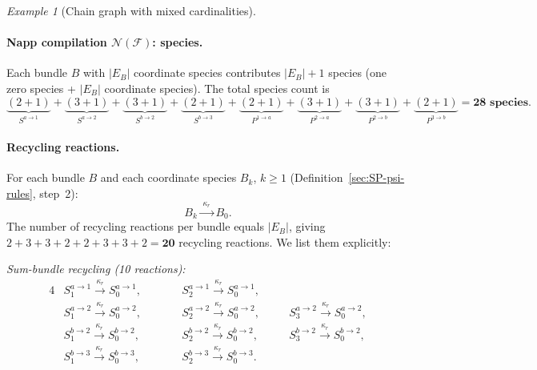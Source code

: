 \documentclass{article}
\theoremstyle{plain}
\theoremstyle{definition}
\theoremstyle{remark}
\newtheorem{example}{Example}[section]
\newcommand{\<}{\langle}
\renewcommand{\>}{\rangle}
\begin{document}
\begin{example}[Chain graph with mixed cardinalities]
 
\paragraph{Napp compilation $\boldsymbol{\mathcal{N}(\mathcal{F})}$: species.}
Each bundle $B$ with $|E_B|$ coordinate species contributes $|E_B|+1$ species
(one zero species + $|E_B|$ coordinate species).
The total species count is
\[
\underbrace{(2{+}1)}_{S^{a\to 1}}
+\underbrace{(3{+}1)}_{S^{a\to 2}}
+\underbrace{(3{+}1)}_{S^{b\to 2}}
+\underbrace{(2{+}1)}_{S^{b\to 3}}
+\underbrace{(2{+}1)}_{P^{1\to a}}
+\underbrace{(3{+}1)}_{P^{2\to a}}
+\underbrace{(3{+}1)}_{P^{2\to b}}
+\underbrace{(2{+}1)}_{P^{3\to b}}
= \mathbf{28 \textbf{ species}}.
\]
 
 
\paragraph{Recycling reactions.}
For each bundle $B$ and each coordinate species $B_k$, $k\ge 1$
(Definition~\ref{sec:SP-psi-rules}, step~2):
\[
B_k \xrightarrow{\;\kappa_r\;} B_0.
\]
The number of recycling reactions per bundle equals $|E_B|$, giving
$2+3+3+2+2+3+3+2 = \mathbf{20}$ recycling reactions.
We list them explicitly:
 
\medskip
\noindent\emph{Sum-bundle recycling (10 reactions):}
\begin{alignat*}{4}
&S^{a\to 1}_1 \xrightarrow{\kappa_r} S^{a\to 1}_0,\qquad
&&S^{a\to 1}_2 \xrightarrow{\kappa_r} S^{a\to 1}_0,
\\[3pt]
&S^{a\to 2}_1 \xrightarrow{\kappa_r} S^{a\to 2}_0,\quad
&&S^{a\to 2}_2 \xrightarrow{\kappa_r} S^{a\to 2}_0,\quad
&&S^{a\to 2}_3 \xrightarrow{\kappa_r} S^{a\to 2}_0,
\\[3pt]
&S^{b\to 2}_1 \xrightarrow{\kappa_r} S^{b\to 2}_0,\quad
&&S^{b\to 2}_2 \xrightarrow{\kappa_r} S^{b\to 2}_0,\quad
&&S^{b\to 2}_3 \xrightarrow{\kappa_r} S^{b\to 2}_0,
\\[3pt]
&S^{b\to 3}_1 \xrightarrow{\kappa_r} S^{b\to 3}_0,\qquad
&&S^{b\to 3}_2 \xrightarrow{\kappa_r} S^{b\to 3}_0.
\end{alignat*}
 

\end{example}
\end{document}
